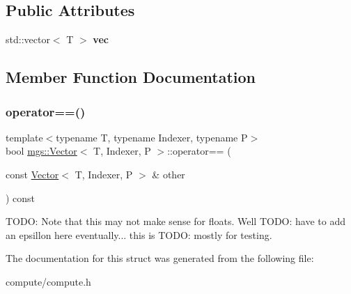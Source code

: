 \subsection*{Public Attributes}
\begin{DoxyCompactItemize}
\item 
\mbox{\label{structmgs_1_1Vector_a6ec3364ab67d162ec7c664349839fdf3}} 
std\+::vector$<$ T $>$ {\bfseries vec}
\end{DoxyCompactItemize}


\subsection{Member Function Documentation}
\mbox{\label{structmgs_1_1Vector_aabe20a2406bb1f408f47b5d3efc2a9ae}} 
\subsubsection{\texorpdfstring{operator==()}{operator==()}}
{\footnotesize\ttfamily template$<$typename T, typename Indexer, typename P$>$ \\
bool \hyperlink{structmgs_1_1Vector}{mgs\+::\+Vector}$<$ T, Indexer, P $>$\+::operator== (\begin{DoxyParamCaption}\item[{const \hyperlink{structmgs_1_1Vector}{Vector}$<$ T, Indexer, P $>$ \&}]{other }\end{DoxyParamCaption}) const\hspace{0.3cm}{\ttfamily [inline]}}

T\+O\+DO\+: Note that this may not make sense for floats. We\textquotesingle{}ll T\+O\+DO\+: have to add an epsillon here eventually... this is T\+O\+DO\+: mostly for testing. 

The documentation for this struct was generated from the following file\+:\begin{DoxyCompactItemize}
\item 
compute/compute.\+h\end{DoxyCompactItemize}

